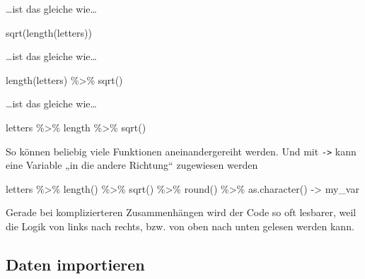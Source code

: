 \documentclass[11pt,german,a4paper]{article}
\newenvironment{Shaded}{\begin{snugshade}}{\end{snugshade}}
\newcommand{\FunctionTok}[1]{\textcolor[rgb]{0.00,0.00,0.00}{#1}}
\newcommand{\NormalTok}[1]{#1}
\newcommand{\OtherTok}[1]{\textcolor[rgb]{0.56,0.35,0.01}{#1}}
\newcommand{\SpecialCharTok}[1]{\textcolor[rgb]{0.00,0.00,0.00}{#1}}
\begin{document}
\ldots ist das gleiche wie\ldots{}

\begin{Shaded}
\begin{Highlighting}[]
\FunctionTok{sqrt}\NormalTok{(}\FunctionTok{length}\NormalTok{(letters))}
\end{Highlighting}
\end{Shaded}

\ldots ist das gleiche wie\ldots{}

\begin{Shaded}
\begin{Highlighting}[]
\FunctionTok{length}\NormalTok{(letters) }\SpecialCharTok{\%\textgreater{}\%}
  \FunctionTok{sqrt}\NormalTok{()}
\end{Highlighting}
\end{Shaded}

\ldots ist das gleiche wie\ldots{}

\begin{Shaded}
\begin{Highlighting}[]
\NormalTok{letters }\SpecialCharTok{\%\textgreater{}\%}
\NormalTok{  length }\SpecialCharTok{\%\textgreater{}\%}
  \FunctionTok{sqrt}\NormalTok{()}
\end{Highlighting}
\end{Shaded}

So können beliebig viele Funktionen aneinandergereiht werden. Und mit \texttt{-\textgreater{}} kann eine Variable „in die andere Richtung`` zugewiesen werden

\begin{Shaded}
\begin{Highlighting}[]
\NormalTok{letters }\SpecialCharTok{\%\textgreater{}\%}
  \FunctionTok{length}\NormalTok{() }\SpecialCharTok{\%\textgreater{}\%}
  \FunctionTok{sqrt}\NormalTok{() }\SpecialCharTok{\%\textgreater{}\%}
  \FunctionTok{round}\NormalTok{() }\SpecialCharTok{\%\textgreater{}\%}
  \FunctionTok{as.character}\NormalTok{() }\OtherTok{{-}\textgreater{}}
\NormalTok{  my\_var}
\end{Highlighting}
\end{Shaded}

Gerade bei komplizierteren Zusammenhängen wird der Code so oft lesbarer, weil die Logik von links nach rechts, bzw. von oben nach unten gelesen werden kann.

\hypertarget{daten-importieren}{%
\subsection{Daten importieren}\label{daten-importieren}}
\end{document}

